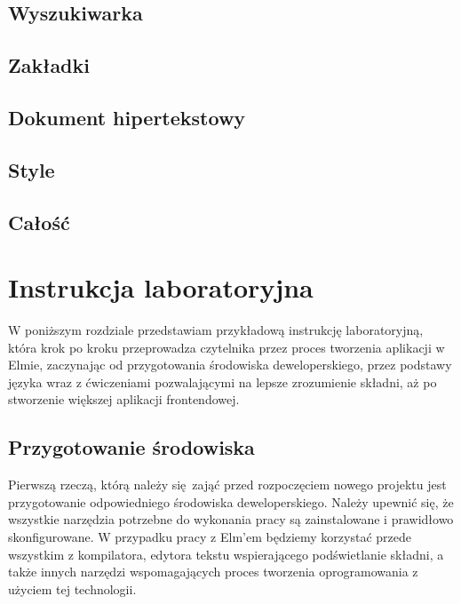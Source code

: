 \documentclass[twoside,a4paper]{report}
\begin{document}
\section{Wyszukiwarka}

\section{Zakładki}

\section{Dokument hipertekstowy}

\section{Style}

\section{Całość}


\chapter{Instrukcja laboratoryjna}
\lstset{frame=none}
W poniższym rozdziale przedstawiam przykładową instrukcję laboratoryjną, która krok po kroku przeprowadza czytelnika przez proces tworzenia aplikacji w Elmie, zaczynając od przygotowania środowiska deweloperskiego, przez podstawy języka wraz z ćwiczeniami pozwalającymi na lepsze zrozumienie składni, aż po stworzenie większej aplikacji frontendowej.

\section{Przygotowanie środowiska}
Pierwszą rzeczą, którą należy się zająć przed rozpoczęciem nowego projektu jest przygotowanie odpowiedniego środowiska deweloperskiego.
Należy upewnić się, że wszystkie narzędzia potrzebne do wykonania pracy są zainstalowane i prawidłowo skonfigurowane.
W przypadku pracy z Elm'em będziemy korzystać przede wszystkim z kompilatora, edytora tekstu wspierającego podświetlanie składni, a także innych narzędzi wspomagających proces tworzenia oprogramowania z użyciem tej technologii.
\end{document}
